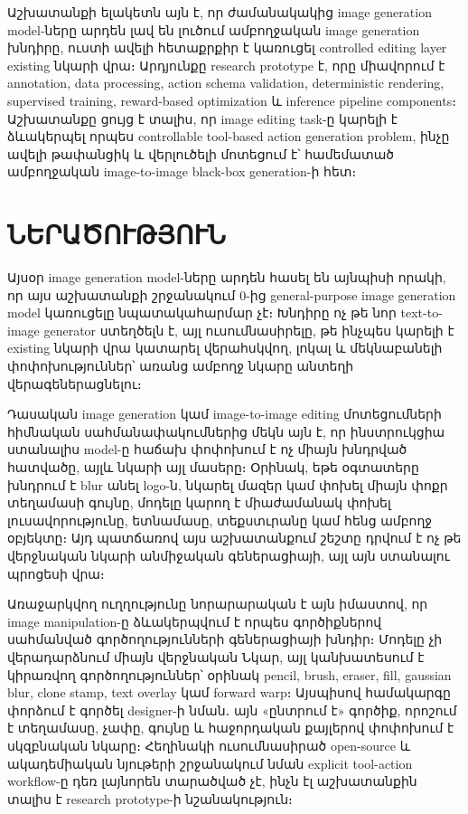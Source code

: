 \documentclass[12pt,a4paper]{report}
\makeatletter
\newcommand{\UseWesternDigits}{%
  \renewcommand{\thepage}{\number\c@page}%
  \renewcommand{\thechapter}{\number\c@chapter}%
  \renewcommand{\thesection}{\number\c@chapter.\number\c@section}%
  \renewcommand{\thesubsection}{\number\c@chapter.\number\c@section.\number\c@subsection}%
  \renewcommand{\thefigure}{\number\c@chapter.\number\c@figure}%
  \renewcommand{\thetable}{\number\c@chapter.\number\c@table}%
  \renewcommand{\theequation}{\number\c@chapter.\number\c@equation}%
  \renewcommand{\theenumi}{\number\c@enumi}%
  \renewcommand{\theenumii}{\number\c@enumii}%
  \renewcommand{\labelenumi}{\theenumi)}%
  \renewcommand{\labelenumii}{\theenumii)}%
}
\makeatother
\begin{document}
Աշխատանքի ելակետն այն է, որ ժամանակակից image generation model-ները արդեն լավ են լուծում ամբողջական image generation խնդիրը, ուստի ավելի հետաքրքիր է կառուցել controlled editing layer existing նկարի վրա։ Արդյունքը research prototype է, որը միավորում է annotation, data processing, action schema validation, deterministic rendering, supervised training, reward-based optimization և inference pipeline components։ Աշխատանքը ցույց է տալիս, որ image editing task-ը կարելի է ձևակերպել որպես controllable tool-based action generation problem, ինչը ավելի թափանցիկ և վերլուծելի մոտեցում է՝ համեմատած ամբողջական image-to-image black-box generation-ի հետ։

\newpage

\UseWesternDigits
\setcounter{page}{4}
\tableofcontents
\newpage

\chapter*{ՆԵՐԱԾՈՒԹՅՈՒՆ}

Այսօր image generation model-ները արդեն հասել են այնպիսի որակի, որ այս աշխատանքի շրջանակում 0-ից general-purpose image generation model կառուցելը նպատակահարմար չէ։ Խնդիրը ոչ թե նոր text-to-image generator ստեղծելն է, այլ ուսումնասիրելը, թե ինչպես կարելի է existing նկարի վրա կատարել վերահսկվող, լոկալ և մեկնաբանելի փոփոխություններ՝ առանց ամբողջ նկարը անտեղի վերագեներացնելու։

Դասական image generation կամ image-to-image editing մոտեցումների հիմնական սահմանափակումներից մեկն այն է, որ ինստրուկցիա ստանալիս model-ը հաճախ փոփոխում է ոչ միայն խնդրված հատվածը, այլև նկարի այլ մասերը։ Օրինակ, եթե օգտատերը խնդրում է blur անել logo-ն, նկարել մազեր կամ փոխել միայն փոքր տեղամասի գույնը, մոդելը կարող է միաժամանակ փոխել լուսավորությունը, ետնամասը, տեքստւրանը կամ հենց ամբողջ օբյեկտը։ Այդ պատճառով այս աշխատանքում շեշտը դրվում է ոչ թե վերջնական նկարի անմիջական գեներացիայի, այլ այն ստանալու պրոցեսի վրա։

Առաջարկվող ուղղությունը նորարարական է այն իմաստով, որ image manipulation-ը ձևակերպվում է որպես գործիքներով սահմանված գործողությունների գեներացիայի խնդիր։ Մոդելը չի վերադարձնում միայն վերջնական Նկար, այլ կանխատեսում է կիրառվող գործողություններ՝ օրինակ pencil, brush, eraser, fill, gaussian blur, clone stamp, text overlay կամ forward warp։ Այսպիսով համակարգը փորձում է գործել designer-ի նման․ այն «ընտրում է» գործիք, որոշում է տեղամասը, չափը, գույնը և հաջորդական քայլերով փոփոխում է սկզբնական նկարը։ Հեղինակի ուսումնասիրած open-source և ակադեմիական նյութերի շրջանակում նման explicit tool-action workflow-ը դեռ լայնորեն տարածված չէ, ինչն էլ աշխատանքին տալիս է research prototype-ի նշանակություն։
\end{document}
